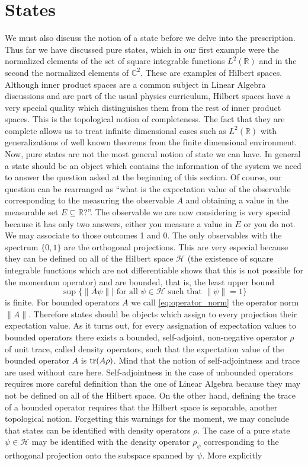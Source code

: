 \documentclass{article}
\begin{document}
\section{States}

We must also discuss the notion of a state before we delve into the prescription. Thus far we have discussed pure states, which in our first example were the normalized elements of the set of square integrable functions $L^2(\mathbb{R})$ and in the second the normalized elements of $\mathbb{C}^2$. These are examples of Hilbert spaces. Although inner product spaces are a common subject in Linear Algebra discussions and are part of the usual physics curriculum, Hilbert spaces have a very special quality which distinguishes them from the rest of inner product spaces. This is the topological notion of completeness. The fact that they are complete allows us to treat infinite dimensional cases such as $L^2(\mathbb{R})$ with generalizations of well known theorems from the finite dimensional environment. Now, pure states are not the most general notion of state we can have. In general a state should be an object which contains the information of the system we need to answer the question asked at the beginning of this section. Of course, our question can be rearranged as ``what is the expectation value of the observable corresponding to the measuring the observable $A$ and obtaining a value in the measurable set $E\subseteq\mathbb{R}$?''. The observable we are now considering is very special because it has only two answers, either you measure a value in $E$ or you do not. We may associate to those outcomes 1 and 0. The only observables with the spectrum $\{0,1\}$ are the orthogonal projections. This are very especial because they can be defined on all of the Hilbert space $\mathcal{H}$ (the existence of square integrable functions which are not differentiable shows that this is not possible for the momentum operator) and are bounded, that is, the least upper bound
\begin{equation}\label{eq:operator_norm}
\sup\{\|A\psi\||\text{ for all }\psi\in\mathcal{H}\text{ such that }\|\psi\|=1\}
\end{equation} 
is finite. For bounded operators $A$ we call \eqref{eq:operator_norm} the operator norm $\|A\|$. Therefore states should be objects which assign to every projection their expectation value. As it turns out, for every assignation of expectation values to bounded operators there exists a bounded, self-adjoint, non-negative operator $\rho$ of unit trace, called density operators, such that the expectation value of the bounded operator $A$ is $\tr(A\rho)$. Mind that the notion of self-adjointness and trace are used without care here. Self-adjointness in the case of unbounded operators requires more careful definition than the one of Linear Algebra because they may not be defined on all of the Hilbert space. On the other hand, defining the trace of a bounded operator requires that the Hilbert space is separable, another topological notion. Forgetting this warnings for the moment, we may conclude that states can be identified with density operators $\rho$. The case of a pure state $\psi\in\mathcal{H}$ may be identified with the density operator $\rho_\psi$ corresponding to the orthogonal projection onto the subspace spanned by $\psi$. More explicitly
\end{document}
